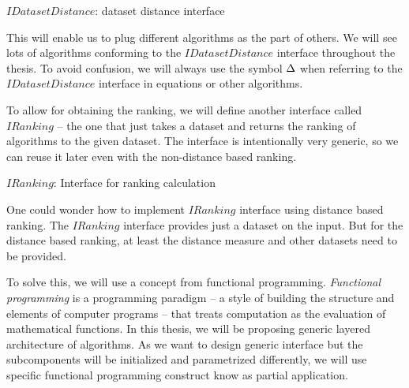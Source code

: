 \IncMargin{1em}
\begin{algorithm}
	\BlankLine
	\caption{$IDatasetDistance$: dataset distance interface}\label{interface:IDatasetDistance}
\end{algorithm}\DecMargin{1em}

This will enable us to plug different algorithms as the part of others. We will see lots of algorithms conforming to the $IDatasetDistance$ interface throughout the thesis. To avoid confusion, we will always use the symbol $\Delta$ when referring to the $IDatasetDistance$ interface in equations or other algorithms.

To allow for obtaining the ranking, we will define another interface called $IRanking$ -- the one that just takes a dataset and returns the ranking of algorithms to the given dataset. The interface is intentionally very generic, so we can reuse it later even with the non-distance based ranking. 

\IncMargin{1em}
\begin{algorithm}
	\BlankLine
	\caption{$IRanking$: Interface for ranking calculation}\label{interface:IRanking}
\end{algorithm}\DecMargin{1em}

One could wonder how to implement $IRanking$ interface using distance based ranking. The $IRanking$ interface provides just a dataset on the input. But for the distance based ranking, at least the distance measure and other datasets need to be provided. 

To solve this, we will use a concept from functional programming.
\emph{Functional programming} \cite{functionalThinking} is a programming paradigm -- a style of building the structure and elements of computer programs -- that treats computation as the evaluation of mathematical functions. In this thesis, we will be proposing generic layered architecture of algorithms. As we want to design generic interface but the subcomponents will be initialized and parametrized differently, we will use specific functional programming construct know as partial application.

